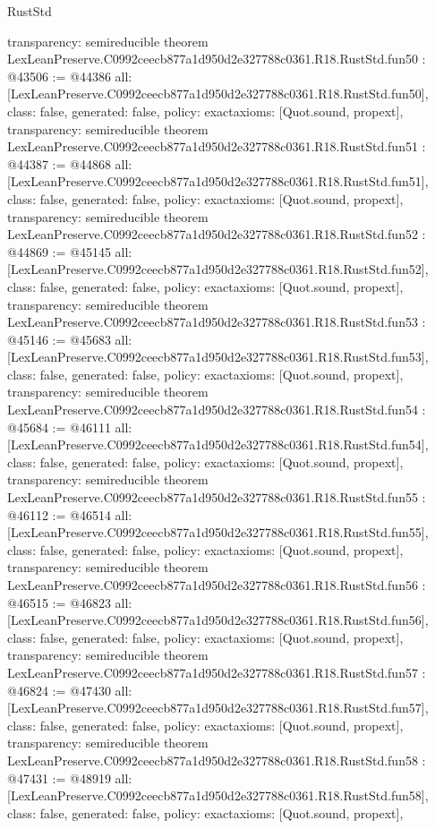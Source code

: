 \begin{lexlean}{RustStd}
\begin{coremodule}
{  transparency: semireducible
}
theorem LexLeanPreserve.C0992ceecb877a1d950d2e327788c0361.R18.RustStd.fun50 : @43506 := @44386 {
  all: [LexLeanPreserve.C0992ceecb877a1d950d2e327788c0361.R18.RustStd.fun50],
  class: false,
  generated: false,
  policy: exact{axioms: [Quot.sound, propext]},
  transparency: semireducible
}
theorem LexLeanPreserve.C0992ceecb877a1d950d2e327788c0361.R18.RustStd.fun51 : @44387 := @44868 {
  all: [LexLeanPreserve.C0992ceecb877a1d950d2e327788c0361.R18.RustStd.fun51],
  class: false,
  generated: false,
  policy: exact{axioms: [Quot.sound, propext]},
  transparency: semireducible
}
theorem LexLeanPreserve.C0992ceecb877a1d950d2e327788c0361.R18.RustStd.fun52 : @44869 := @45145 {
  all: [LexLeanPreserve.C0992ceecb877a1d950d2e327788c0361.R18.RustStd.fun52],
  class: false,
  generated: false,
  policy: exact{axioms: [Quot.sound, propext]},
  transparency: semireducible
}
theorem LexLeanPreserve.C0992ceecb877a1d950d2e327788c0361.R18.RustStd.fun53 : @45146 := @45683 {
  all: [LexLeanPreserve.C0992ceecb877a1d950d2e327788c0361.R18.RustStd.fun53],
  class: false,
  generated: false,
  policy: exact{axioms: [Quot.sound, propext]},
  transparency: semireducible
}
theorem LexLeanPreserve.C0992ceecb877a1d950d2e327788c0361.R18.RustStd.fun54 : @45684 := @46111 {
  all: [LexLeanPreserve.C0992ceecb877a1d950d2e327788c0361.R18.RustStd.fun54],
  class: false,
  generated: false,
  policy: exact{axioms: [Quot.sound, propext]},
  transparency: semireducible
}
theorem LexLeanPreserve.C0992ceecb877a1d950d2e327788c0361.R18.RustStd.fun55 : @46112 := @46514 {
  all: [LexLeanPreserve.C0992ceecb877a1d950d2e327788c0361.R18.RustStd.fun55],
  class: false,
  generated: false,
  policy: exact{axioms: [Quot.sound, propext]},
  transparency: semireducible
}
theorem LexLeanPreserve.C0992ceecb877a1d950d2e327788c0361.R18.RustStd.fun56 : @46515 := @46823 {
  all: [LexLeanPreserve.C0992ceecb877a1d950d2e327788c0361.R18.RustStd.fun56],
  class: false,
  generated: false,
  policy: exact{axioms: [Quot.sound, propext]},
  transparency: semireducible
}
theorem LexLeanPreserve.C0992ceecb877a1d950d2e327788c0361.R18.RustStd.fun57 : @46824 := @47430 {
  all: [LexLeanPreserve.C0992ceecb877a1d950d2e327788c0361.R18.RustStd.fun57],
  class: false,
  generated: false,
  policy: exact{axioms: [Quot.sound, propext]},
  transparency: semireducible
}
theorem LexLeanPreserve.C0992ceecb877a1d950d2e327788c0361.R18.RustStd.fun58 : @47431 := @48919 {
  all: [LexLeanPreserve.C0992ceecb877a1d950d2e327788c0361.R18.RustStd.fun58],
  class: false,
  generated: false,
  policy: exact{axioms: [Quot.sound, propext]},
}
\end{coremodule}
\end{lexlean}
